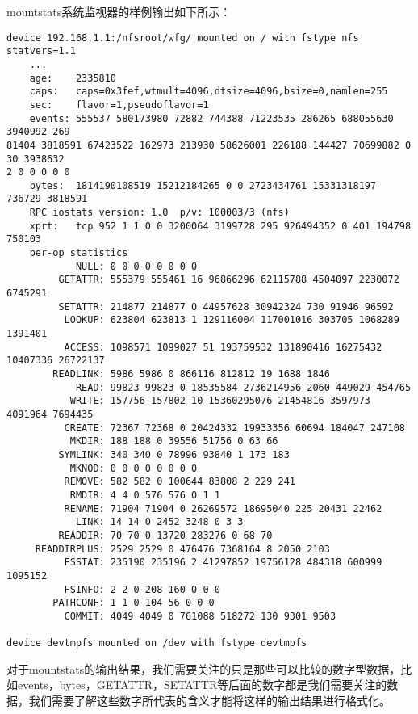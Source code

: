 \begin{itemize}
mountstats系统监视器的样例输出如下所示：
{\footnotesize
\begin{verbatim}
device 192.168.1.1:/nfsroot/wfg/ mounted on / with fstype nfs statvers=1.1
    ...
    age:    2335810
    caps:   caps=0x3fef,wtmult=4096,dtsize=4096,bsize=0,namlen=255
    sec:    flavor=1,pseudoflavor=1
    events: 555537 580173980 72882 744388 71223535 286265 688055630 3940992 269 
81404 3818591 67423522 162973 213930 58626001 226188 144427 70699882 0 30 3938632 
2 0 0 0 0 0 
    bytes:  1814190108519 15212184265 0 0 2723434761 15331318197 736729 3818591 
    RPC iostats version: 1.0  p/v: 100003/3 (nfs)
    xprt:   tcp 952 1 1 0 0 3200064 3199728 295 926494352 0 401 194798 750103
    per-op statistics
            NULL: 0 0 0 0 0 0 0 0 
         GETATTR: 555379 555461 16 96866296 62115788 4504097 2230072 6745291
         SETATTR: 214877 214877 0 44957628 30942324 730 91946 96592
          LOOKUP: 623804 623813 1 129116004 117001016 303705 1068289 1391401
          ACCESS: 1098571 1099027 51 193759532 131890416 16275432 10407336 26722137
        READLINK: 5986 5986 0 866116 812812 19 1688 1846
            READ: 99823 99823 0 18535584 2736214956 2060 449029 454765
           WRITE: 157756 157802 10 15360295076 21454816 3597973 4091964 7694435
          CREATE: 72367 72368 0 20424332 19933356 60694 184047 247108
           MKDIR: 188 188 0 39556 51756 0 63 66
         SYMLINK: 340 340 0 78996 93840 1 173 183 
           MKNOD: 0 0 0 0 0 0 0 0 
          REMOVE: 582 582 0 100644 83808 2 229 241 
           RMDIR: 4 4 0 576 576 0 1 1 
          RENAME: 71904 71904 0 26269572 18695040 225 20431 22462
            LINK: 14 14 0 2452 3248 0 3 3 
         READDIR: 70 70 0 13720 283276 0 68 70
     READDIRPLUS: 2529 2529 0 476476 7368164 8 2050 2103
          FSSTAT: 235190 235196 2 41297852 19756128 484318 600999 1095152
          FSINFO: 2 2 0 208 160 0 0 0 
        PATHCONF: 1 1 0 104 56 0 0 0 
          COMMIT: 4049 4049 0 761088 518272 130 9301 9503

device devtmpfs mounted on /dev with fstype devtmpfs
\end{verbatim}
}
对于mountstats的输出结果，我们需要关注的只是那些可以比较的数字型数据，比如events，bytes，GETATTR，SETATTR等后面的数字都是我们需要关注的数据，我们需要了解这些数字所代表的含义才能将这样的输出结果进行格式化。


\end{itemize}
